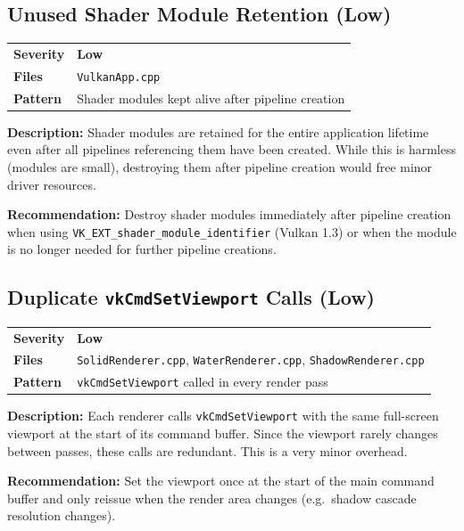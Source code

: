\documentclass[a4paper,10pt]{article}
\newcommand{\severity}[1]{%
  \ifstrequal{#1}{Critical}{\textcolor{critical}{\textbf{#1}}}{%
  \ifstrequal{#1}{High}{\textcolor{high}{\textbf{#1}}}{%
  \ifstrequal{#1}{Medium}{\textcolor{medium}{\textbf{#1}}}{%
  \ifstrequal{#1}{Low}{\textcolor{low}{\textbf{#1}}}{#1}}}}}
\begin{document}
\subsection{Unused Shader Module Retention (Low)}

\begin{tabular}{ll}
\textbf{Severity} & \severity{Low} \\
\textbf{Files}     & \texttt{VulkanApp.cpp} \\
\textbf{Pattern}   & Shader modules kept alive after pipeline creation \\
\end{tabular}

\vspace{0.5em}
\noindent
\textbf{Description:} Shader modules are retained for the entire application
lifetime even after all pipelines referencing them have been created. While
this is harmless (modules are small), destroying them after pipeline creation
would free minor driver resources.

\noindent\textbf{Recommendation:} Destroy shader modules immediately after
pipeline creation when using \texttt{VK\_EXT\_shader\_module\_identifier}
(Vulkan 1.3) or when the module is no longer needed for further pipeline
creations.

\subsection{Duplicate \texttt{vkCmdSetViewport} Calls (Low)}

\begin{tabular}{ll}
\textbf{Severity} & \severity{Low} \\
\textbf{Files}     & \texttt{SolidRenderer.cpp}, \texttt{WaterRenderer.cpp},
                      \texttt{ShadowRenderer.cpp} \\
\textbf{Pattern}   & \texttt{vkCmdSetViewport} called in every render pass \\
\end{tabular}

\vspace{0.5em}
\noindent
\textbf{Description:} Each renderer calls \texttt{vkCmdSetViewport} with the
same full-screen viewport at the start of its command buffer. Since the
viewport rarely changes between passes, these calls are redundant. This is
a very minor overhead.

\noindent\textbf{Recommendation:} Set the viewport once at the start of the
main command buffer and only reissue when the render area changes (e.g.\
shadow cascade resolution changes).
\end{document}
